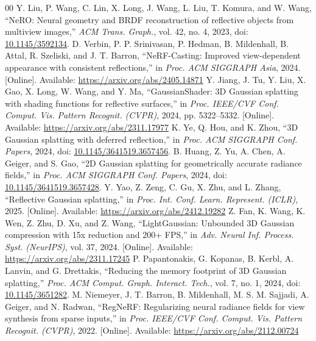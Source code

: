\begin{thebibliography}{00}
 Y. Liu, P. Wang, C. Lin, X. Long, J. Wang, L. Liu, T. Komura, and W. Wang, ``NeRO: Neural geometry and BRDF reconstruction of reflective objects from multiview images,'' \textit{ACM Trans. Graph.}, vol. 42, no. 4, 2023, doi: \href{https://doi.org/10.1145/3592134}{10.1145/3592134}.
 D. Verbin, P. P. Srinivasan, P. Hedman, B. Mildenhall, B. Attal, R. Szeliski, and J. T. Barron, ``NeRF-Casting: Improved view-dependent appearance with consistent reflections,'' in \textit{Proc. ACM SIGGRAPH Asia}, 2024. [Online]. Available: \url{https://arxiv.org/abs/2405.14871}
 Y. Jiang, J. Tu, Y. Liu, X. Gao, X. Long, W. Wang, and Y. Ma, ``GaussianShader: 3D Gaussian splatting with shading functions for reflective surfaces,'' in \textit{Proc. IEEE/CVF Conf. Comput. Vis. Pattern Recognit. (CVPR)}, 2024, pp. 5322--5332. [Online]. Available: \url{https://arxiv.org/abs/2311.17977}
 K. Ye, Q. Hou, and K. Zhou, ``3D Gaussian splatting with deferred reflection,'' in \textit{Proc. ACM SIGGRAPH Conf. Papers}, 2024, doi: \href{https://doi.org/10.1145/3641519.3657456}{10.1145/3641519.3657456}.
 B. Huang, Z. Yu, A. Chen, A. Geiger, and S. Gao, ``2D Gaussian splatting for geometrically accurate radiance fields,'' in \textit{Proc. ACM SIGGRAPH Conf. Papers}, 2024, doi: \href{https://doi.org/10.1145/3641519.3657428}{10.1145/3641519.3657428}.
 Y. Yao, Z. Zeng, C. Gu, X. Zhu, and L. Zhang, ``Reflective Gaussian splatting,'' in \textit{Proc. Int. Conf. Learn. Represent. (ICLR)}, 2025. [Online]. Available: \url{https://arxiv.org/abs/2412.19282}
 Z. Fan, K. Wang, K. Wen, Z. Zhu, D. Xu, and Z. Wang, ``LightGaussian: Unbounded 3D Gaussian compression with 15x reduction and 200+ FPS,'' in \textit{Adv. Neural Inf. Process. Syst. (NeurIPS)}, vol. 37, 2024. [Online]. Available: \url{https://arxiv.org/abs/2311.17245}
 P. Papantonakis, G. Kopanas, B. Kerbl, A. Lanvin, and G. Drettakis, ``Reducing the memory footprint of 3D Gaussian splatting,'' \textit{Proc. ACM Comput. Graph. Interact. Tech.}, vol. 7, no. 1, 2024, doi: \href{https://doi.org/10.1145/3651282}{10.1145/3651282}.
 M. Niemeyer, J. T. Barron, B. Mildenhall, M. S. M. Sajjadi, A. Geiger, and N. Radwan, ``RegNeRF: Regularizing neural radiance fields for view synthesis from sparse inputs,'' in \textit{Proc. IEEE/CVF Conf. Comput. Vis. Pattern Recognit. (CVPR)}, 2022. [Online]. Available: \url{https://arxiv.org/abs/2112.00724}

\end{thebibliography}

